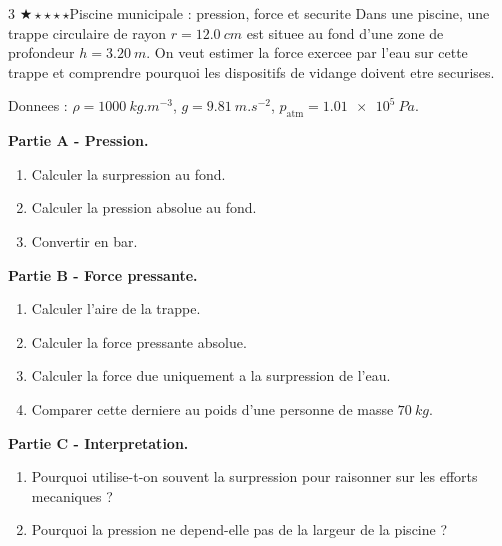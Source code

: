 \documentclass[11pt,a4paper]{article}
\newcommand{\diffone}{\(\bigstar\star\star\star\star\)}
\begin{document}
\begin{probleme}{3 \diffone}{Piscine municipale : pression, force et securite}
Dans une piscine, une trappe circulaire de rayon \(r=\SI{12.0}{cm}\) est situee au fond d'une zone de profondeur \(h=\SI{3.20}{m}\). On veut estimer la force exercee par l'eau sur cette trappe et comprendre pourquoi les dispositifs de vidange doivent etre securises.

Donnees : \(\rho=\SI{1000}{kg.m^{-3}}\), \(g=\SI{9.81}{m.s^{-2}}\), \(p_{\text{atm}}=\SI{1.01e5}{Pa}\).

\textbf{Partie A - Pression.}
\begin{enumerate}
\item Calculer la surpression au fond.
\item Calculer la pression absolue au fond.
\item Convertir en bar.
\end{enumerate}

\textbf{Partie B - Force pressante.}
\begin{enumerate}[resume]
\item Calculer l'aire de la trappe.
\item Calculer la force pressante absolue.
\item Calculer la force due uniquement a la surpression de l'eau.
\item Comparer cette derniere au poids d'une personne de masse \(\SI{70}{kg}\).
\end{enumerate}

\textbf{Partie C - Interpretation.}
\begin{enumerate}[resume]
\item Pourquoi utilise-t-on souvent la surpression pour raisonner sur les efforts mecaniques ?
\item Pourquoi la pression ne depend-elle pas de la largeur de la piscine ?
\end{enumerate}
\end{probleme}
\end{document}
